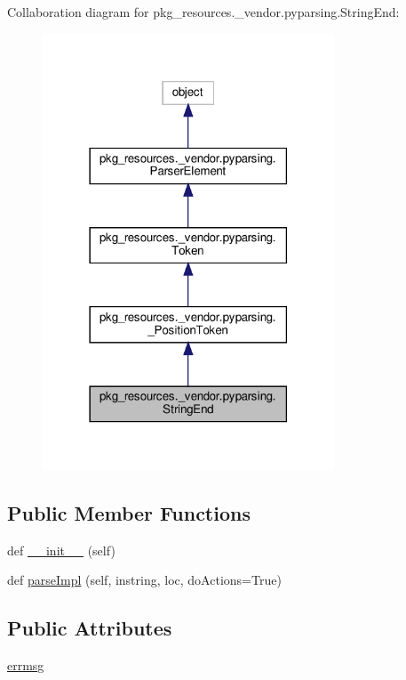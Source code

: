 Collaboration diagram for pkg\+\_\+resources.\+\_\+vendor.\+pyparsing.\+String\+End\+:
\nopagebreak
\begin{figure}[H]
\begin{center}
\leavevmode
\includegraphics[width=246pt]{classpkg__resources_1_1__vendor_1_1pyparsing_1_1StringEnd__coll__graph}
\end{center}
\end{figure}
\subsection*{Public Member Functions}
\begin{DoxyCompactItemize}
\item 
def \hyperlink{classpkg__resources_1_1__vendor_1_1pyparsing_1_1StringEnd_a484d51da260c59aa7066371d7d7230a3}{\+\_\+\+\_\+init\+\_\+\+\_\+} (self)
\item 
def \hyperlink{classpkg__resources_1_1__vendor_1_1pyparsing_1_1StringEnd_aa44b87bd886839763f0ad674dc419a5d}{parse\+Impl} (self, instring, loc, do\+Actions=True)
\end{DoxyCompactItemize}
\subsection*{Public Attributes}
\begin{DoxyCompactItemize}
\item 
\hyperlink{classpkg__resources_1_1__vendor_1_1pyparsing_1_1StringEnd_aacf043cfe06aca93057d291fb7bc39ec}{errmsg}
\end{DoxyCompactItemize}
